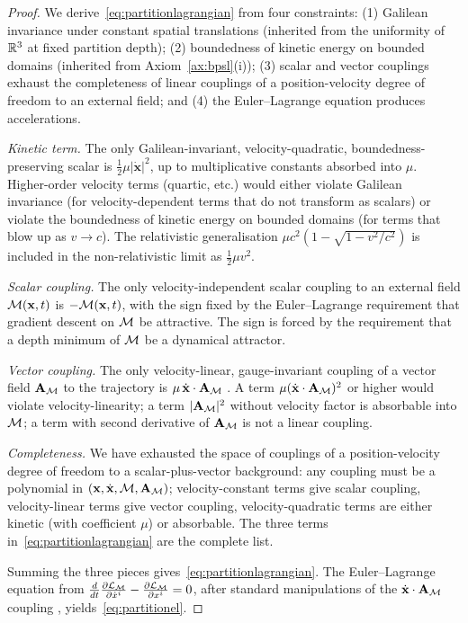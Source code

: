 \begin{proof}
We derive~\eqref{eq:partitionlagrangian} from four constraints: (1) Galilean invariance under constant spatial translations (inherited from the uniformity of $\mathbb{R}^{3}$ at fixed partition depth); (2) boundedness of kinetic energy on bounded domains (inherited from Axiom~\ref{ax:bpsl}(i)); (3) scalar and vector couplings exhaust the completeness of linear couplings of a position-velocity degree of freedom to an external field; and (4) the Euler--Lagrange equation produces accelerations.

\emph{Kinetic term.} The only Galilean-invariant, velocity-quadratic, boundedness-preserving scalar is $\tfrac{1}{2}\mu|\dot{\mathbf{x}}|^{2}$, up to multiplicative constants absorbed into $\mu$. Higher-order velocity terms (quartic, etc.) would either violate Galilean invariance (for velocity-dependent terms that do not transform as scalars) or violate the boundedness of kinetic energy on bounded domains (for terms that blow up as $v\to c$). The relativistic generalisation $\mu c^{2}(1-\sqrt{1-v^{2}/c^{2}})$ is included in the non-relativistic limit as $\tfrac{1}{2}\mu v^{2}$.

\emph{Scalar coupling.} The only velocity-independent scalar coupling to an external field $\mathcal{M}(\mathbf{x},t)$ is $-\mathcal{M}(\mathbf{x},t)$, with the sign fixed by the Euler--Lagrange requirement that gradient descent on $\mathcal{M}$ be attractive. The sign is forced by the requirement that a depth minimum of $\mathcal{M}$ be a dynamical attractor.

\emph{Vector coupling.} The only velocity-linear, gauge-invariant coupling of a vector field $\mathbf{A}_{\mathcal{M}}$ to the trajectory is $\mu\,\dot{\mathbf{x}}\cdot\mathbf{A}_{\mathcal{M}}$ \citep{landaulifshitz1}. A term $\mu(\dot{\mathbf{x}}\cdot\mathbf{A}_{\mathcal{M}})^{2}$ or higher would violate velocity-linearity; a term $|\mathbf{A}_{\mathcal{M}}|^{2}$ without velocity factor is absorbable into $\mathcal{M}$; a term with second derivative of $\mathbf{A}_{\mathcal{M}}$ is not a linear coupling.

\emph{Completeness.} We have exhausted the space of couplings of a position-velocity degree of freedom to a scalar-plus-vector background: any coupling must be a polynomial in $(\mathbf{x},\dot{\mathbf{x}},\mathcal{M},\mathbf{A}_{\mathcal{M}})$; velocity-constant terms give scalar coupling, velocity-linear terms give vector coupling, velocity-quadratic terms are either kinetic (with coefficient $\mu$) or absorbable. The three terms in~\eqref{eq:partitionlagrangian} are the complete list.

Summing the three pieces gives~\eqref{eq:partitionlagrangian}. The Euler--Lagrange equation from $\frac{d}{dt}\frac{\partial\mathcal{L}_{\mathcal{M}}}{\partial\dot{x}^{i}}-\frac{\partial\mathcal{L}_{\mathcal{M}}}{\partial x^{i}}=0$, after standard manipulations of the $\dot{\mathbf{x}}\cdot\mathbf{A}_{\mathcal{M}}$ coupling \citep[pp. 48--51]{landaulifshitz1}, yields~\eqref{eq:partitionel}.
\end{proof}

